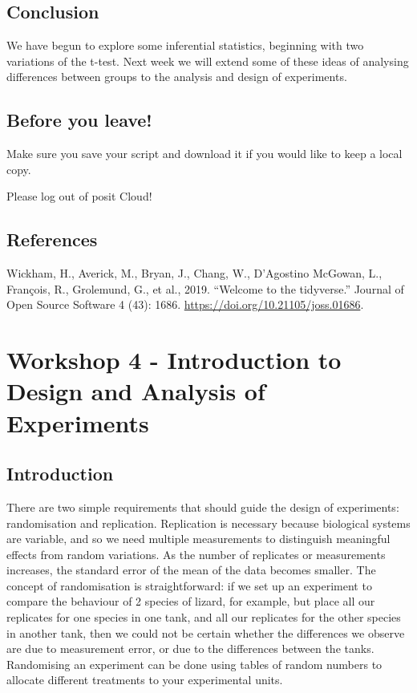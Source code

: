 \documentclass[
]{book}
\begin{document}
\section{Conclusion}\label{conclusion-2}

We have begun to explore some inferential statistics, beginning with two variations of the t-test. Next week we will extend some of these ideas of analysing differences between groups to the analysis and design of experiments.

\section{Before you leave!}\label{before-you-leave-2}

Make sure you save your script and download it if you would like to keep a local copy.

Please log out of posit Cloud!

\section{References}\label{references-2}

Wickham, H., Averick, M., Bryan, J., Chang, W., D'Agostino McGowan, L., François, R., Grolemund, G., et al., 2019. ``Welcome to the tidyverse.'' Journal of Open Source Software 4 (43): 1686. \url{https://doi.org/10.21105/joss.01686}.

\chapter{Workshop 4 - Introduction to Design and Analysis of Experiments}\label{workshop-4---introduction-to-design-and-analysis-of-experiments}

\section{Introduction}\label{introduction-3}

There are two simple requirements that should guide the design of experiments: randomisation and replication. Replication is necessary because biological systems are variable, and so we need multiple measurements to distinguish meaningful effects from random variations. As the number of replicates or measurements increases, the standard error of the mean of the data becomes smaller.
The concept of randomisation is straightforward: if we set up an experiment to compare the behaviour of 2 species of lizard, for example, but place all our replicates for one species in one tank, and all our replicates for the other species in another tank, then we could not be certain whether the differences we observe are due to measurement error, or due to the differences between the tanks. Randomising an experiment can be done using tables of random numbers to allocate different treatments to your experimental units.
\end{document}
